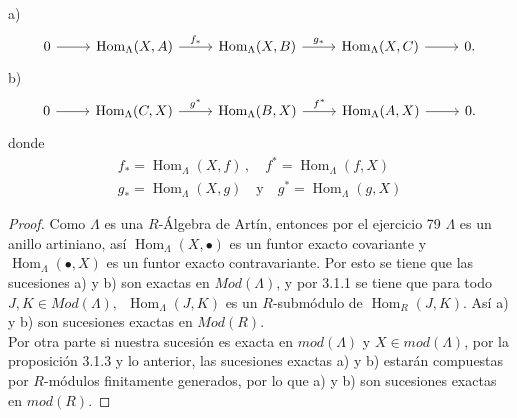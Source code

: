 \documentclass{article}
\begin{document}
\begin{enumerate}[label=\textbf{Ej \arabic*.}]
		a)
		\[\begin{tikzcd}
			0\arrow{r}{} & \operatorname{Hom}_\Lambda(X,A)\arrow{r}{f_*} & \operatorname{Hom}_\Lambda(X,B)\arrow{r}{g_*}&
			\operatorname{Hom}_\Lambda(X,C)\arrow{r}{}& 0.
		\end{tikzcd}
		\]
		b)
		\[\begin{tikzcd}
			0\arrow{r}{} & \operatorname{Hom}_\Lambda(C,X)\arrow{r}{g^*} & \operatorname{Hom}_\Lambda(B,X)\arrow{r}{f^*}&
			\operatorname{Hom}_\Lambda(A,X)\arrow{r}{}& 0.
		\end{tikzcd}
		\]
		donde 
		\begin{align*}
			f_*= \operatorname{Hom}_\Lambda(X,f)\,,\quad
			f^*= \operatorname{Hom}_\Lambda(f,X)\\
			g_*= \operatorname{Hom}_\Lambda(X,g)\quad \text{y}\quad
			g^*= \operatorname{Hom}_\Lambda(g,X)
		\end{align*}
		\begin{proof}
			Como $\Lambda$ es una $R$-Álgebra de Artín, entonces por el ejercicio 79 $\Lambda$ es un anillo artiniano, así 
			$ \operatorname{Hom}_\Lambda(X,\bullet)$ es un funtor exacto covariante y $ \operatorname{Hom}_\Lambda(\bullet,X)$ es un 
			funtor exacto contravariante. Por esto se tiene que las sucesiones a) y b) son exactas en $Mod(\Lambda)$, y por 3.1.1 se tiene que para todo 
			$J,K\in Mod(\Lambda),\,\,\, \operatorname{Hom}_\Lambda(J,K)$ es un $R$-submódulo de $ \operatorname{Hom}_R(J,K)$. Así a) y b)
			son sucesiones exactas en $Mod(R)$.\\
			
			Por otra parte si nuestra sucesión es exacta en $mod(\Lambda)$ y $X\in mod(\Lambda)$, por la proposición 3.1.3 y lo anterior, las sucesiones
			exactas a) y b) estarán compuestas por $R$-módulos finitamente generados, por lo que a) y b) son sucesiones exactas en $mod(R)$.
		\end{proof}
		

\end{enumerate}
\end{document}
